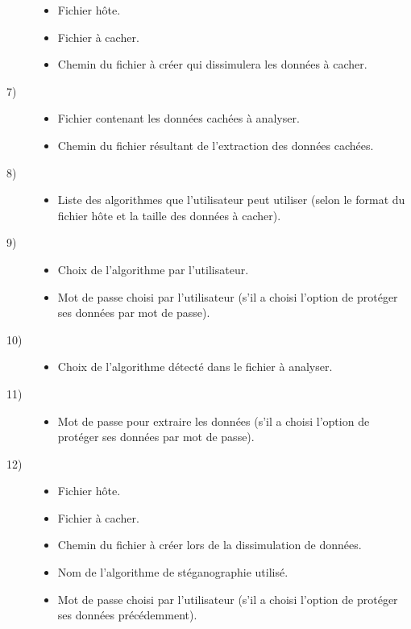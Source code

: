 \documentclass[11pt]{article}
\begin{document}
\begin{description}
\begin{itemize}
\item Fichier hôte.
\item Fichier à cacher.
\item Chemin du fichier à créer qui dissimulera les données à cacher.
\end{itemize}
\item[7)]
\begin{itemize}
\item Fichier contenant les données cachées à analyser.
\item Chemin du fichier résultant de l'extraction des données cachées.
\end{itemize}
\item[8)]
\begin{itemize}
\item Liste des algorithmes que l'utilisateur peut utiliser (selon le format du
    fichier hôte et la taille des données à cacher).
\end{itemize}
\item[9)]
\begin{itemize}
\item Choix de l'algorithme par l'utilisateur.
\item Mot de passe choisi par l'utilisateur (s'il a choisi l'option de protéger
    ses données par mot de passe).
\end{itemize}
\item[10)]
\begin{itemize}
\item Choix de l'algorithme détecté dans le fichier à analyser.
\end{itemize}
\item[11)]
\begin{itemize}
\item Mot de passe pour extraire les données (s'il a choisi l'option de
    protéger ses données par mot de passe).
\end{itemize}
\item[12)]
\begin{itemize}
\item Fichier hôte.
\item Fichier à cacher.
\item Chemin du fichier à créer lors de la dissimulation de données.
\item Nom de l'algorithme de stéganographie utilisé.
\item Mot de passe choisi par l'utilisateur (s'il a choisi l'option de protéger
    ses données précédemment).
\end{itemize}

\end{description}
\end{document}
